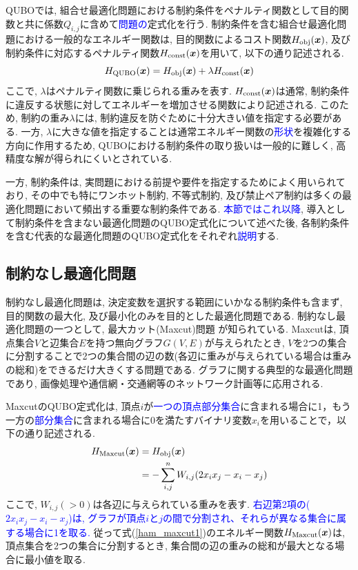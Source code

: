 \documentclass[submit,techrep,noauthor]{ipsj}
\begin{document}
QUBOでは, 組合せ最適化問題における制約条件をペナルティ関数として目的関数と共に係数$Q_{i,j}$に含めて\textcolor{blue}{問題の}定式化を行う. 制約条件を含む組合せ最適化問題における一般的なエネルギー関数は, 目的関数によるコスト関数$H_{\rm{obj}}(\bm{x})$, 及び制約条件に対応するペナルティ関数$H_{\rm{const}}(\bm{x})$を用いて, 以下の通り記述される.
\begin{equation}
H_{\rm{QUBO}}(\bm{x}) = H_{\rm{obj}}(\bm{x}) + \lambda H_{\rm{const}}(\bm{x})
\label{H_qubo}
\end{equation}
ここで, $\lambda$はペナルティ関数に乗じられる重みを表す. $H_{\rm{const}}(\bm{x})$は通常, 制約条件に違反する状態に対してエネルギーを増加させる関数により記述される. このため, 制約の重み$\lambda$には, 制約違反を防ぐために十分大きい値を指定する必要がある. 一方, $\lambda$に大きな値を指定することは通常エネルギー関数の\textcolor{blue}{形状}を複雑化する方向に作用するため, QUBOにおける制約条件の取り扱いは一般的に難しく, 高精度な解が得られにくいとされている\cite{kumagai, komatsu, kumagai2}. 

一方, 制約条件は, 実問題における前提や要件を指定するためによく用いられており, その中でも特にワンホット制約, 不等式制約, 及び禁止ペア制約は多くの最適化問題において頻出する重要な制約条件である. \textcolor{blue}{本節ではこれ以降}, 導入として制約条件を含まない最適化問題のQUBO定式化について述べた後, 各制約条件を含む代表的な最適化問題のQUBO定式化をそれぞれ\textcolor{blue}{説明}する.

\subsection{制約なし最適化問題}

制約なし最適化問題は, 決定変数を選択する範囲にいかなる制約条件も含まず, 目的関数の最大化, 及び最小化のみを目的とした最適化問題である. 制約なし最適化問題の一つとして, 最大カット(Maxcut)問題 が知られている. Maxcutは, 頂点集合$V$と辺集合$E$を持つ無向グラフ$G(V,E)$が与えられたとき, $V$を2つの集合に分割することで2つの集合間の辺の数(各辺に重みが与えられている場合は重みの総和)をできるだけ大きくする問題である\cite{maxcut}. グラフに関する典型的な最適化問題であり, 画像処理や通信網・交通網等のネットワーク計画等に応用される.

MaxcutのQUBO定式化は, 頂点$i$が\textcolor{blue}{一つの頂点部分集合}に含まれる場合に1，もう一方の\textcolor{blue}{部分集合}に含まれる場合に0を満たすバイナリ変数$x_{i}$を用いることで，以下の通り記述される. 
\begin{align}
H_{\rm{Maxcut}}(\bm{x}) &= H_{\rm{obj}}(\bm{x})\nonumber\\
&= -\sum_{i,j}^{n}W_{i,j}(2x_{i}x_{j}-x_{i}-x_{j})
\label{ham_maxcut1}
\end{align}
ここで, $W_{i,j}(>0)$は各辺に与えられている重みを表す. \textcolor{blue}{右辺第2項の($2x_{i}x_{j}-x_{i}-x_{j}$)は, グラフが頂点$i$と$j$の間で分割され、それらが異なる集合に属する場合に1を取る.} 従って式(\ref{ham_maxcut1})のエネルギー関数$H_{\rm{Maxcut}}(\bm{x})$は, 頂点集合を2つの集合に分割するとき, 集合間の辺の重みの総和が最大となる場合に最小値を取る.
\end{document}
